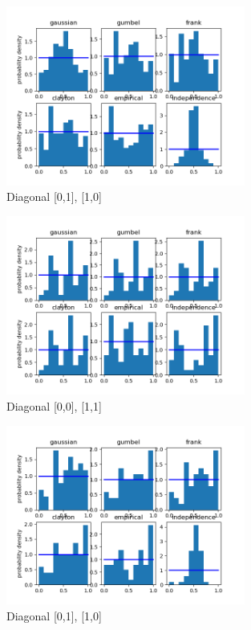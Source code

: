 \begin{figure}[h]
	\centering
	\includegraphics[width=0.7\textwidth]{RTS/Area_1/2020-08-27_18_00-2020-08-27_19_00-1.png}
	\caption{Diagonal [0,1], [1,0]}
\end{figure}



\begin{figure}[h]
	\centering
	\includegraphics[width=0.7\textwidth]{RTS/Area_1/2020-11-11_02_00-2020-11-11_03_00-0.png}
	\caption{Diagonal [0,0], [1,1]}
\end{figure}

\begin{figure}[h]
	\centering
	\includegraphics[width=0.7\textwidth]{RTS/Area_1/2020-11-11_02_00-2020-11-11_03_00-1.png}
	\caption{Diagonal [0,1], [1,0]}
\end{figure}

